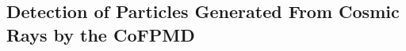 \documentclass{article}
\begin{document}
\begin{multicols}{2}
\section{Detection of Particles Generated From Cosmic Rays by the  CoFPMD}




















\end{multicols}


\end{document}
